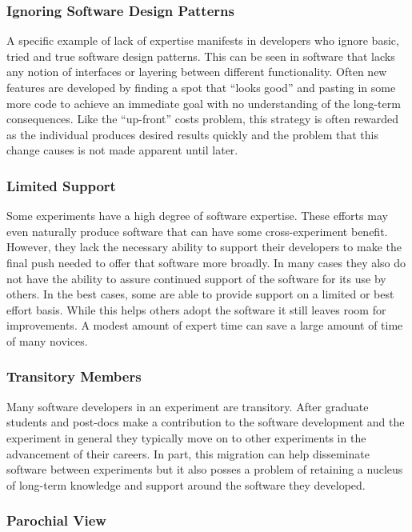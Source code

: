 \subsubsection{Ignoring Software Design Patterns}

A specific example of lack of expertise manifests in developers who
ignore basic, tried and true software design patterns.  This can be
seen in software that lacks any notion of interfaces or layering
between different functionality.  Often new features are developed by
finding a spot that ``looks good'' and pasting in some more code to
achieve an immediate goal with no understanding of the long-term consequences.
Like the ``up-front'' costs problem, this strategy is often rewarded as the
individual produces desired results quickly and the problem that this change
causes is not made apparent until later.

\subsubsection{Limited Support}

Some experiments have a high degree of software expertise.  These
efforts may even naturally produce software that can have some
cross-experiment benefit.  However, they lack the necessary ability to
support their developers to make the final push needed to offer that
software more broadly.  In many cases they also do not have the ability
to assure continued support of the software for its use by others.
In the best cases, some are able to provide support on a limited or best effort basis.  
While this helps others adopt the software it still leaves room
for improvements.  A modest amount of expert time can save a large amount of time of many novices.

\subsubsection{Transitory Members}

Many software developers in an experiment are transitory.  After
graduate students and post-docs make a contribution to the software
development and the experiment in general they typically move on to
other experiments in the advancement of their careers.  In part, this migration
can help disseminate software between experiments but it also
posses a problem of retaining a nucleus of long-term knowledge and
support around the software they developed.

\subsubsection{Parochial View}

